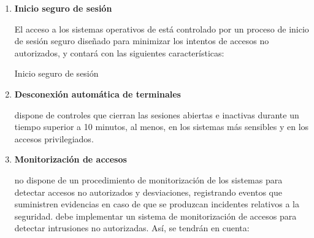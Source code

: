 \begin{enumerate}[label=\alph*)]
    \item \textbf{Inicio seguro de sesión}

    El acceso a los sistemas operativos de \Beneficiario{} está controlado por un proceso de inicio de sesión seguro diseñado para minimizar los intentos de accesos no autorizados, y contará con las siguientes características:

    \begin{table}[H]
        \centering
        \small
        \caption{Inicio seguro de sesión}
        \label{tab:guia-sgsi-inicio-sesión}
        \normalsize
    \end{table}

    \vspace{1em}

    \item \textbf{Desconexión automática de terminales}

    \Beneficiario{} dispone de controles que cierran las sesiones abiertas e inactivas durante un tiempo superior a 10 minutos, al menos, en los sistemas más sensibles y en los accesos privilegiados.

    \item \textbf{Monitorización de accesos}

    \Beneficiario{} no dispone de un procedimiento de monitorización de los sistemas para detectar accesos no autorizados y desviaciones, registrando eventos que suministren evidencias en caso de que se produzcan incidentes relativos a la seguridad. \Beneficiario{} debe implementar un sistema de monitorización de accesos para detectar intrusiones no autorizadas. Así, se tendrán en cuenta:


\end{enumerate}
